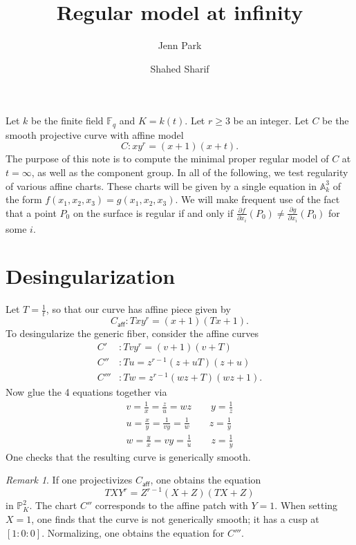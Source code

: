 \documentclass{article}
\newcommand{\caff}{C_{\textsf{aff}}}
\theoremstyle{plain}
\theoremstyle{definition}
\theoremstyle{remark}
\newtheorem{remark}[theorem]{Remark}
\newcommand{\F}{\ensuremath{\mathbb{F}}}
\newcommand{\Pro}{\ensuremath{\mathbb{P}}}
\begin{document}
\title{Regular model at infinity}
\author{Jenn Park \and Shahed Sharif}
\maketitle

Let $k$ be the finite field $\F_q$ and $K = k(t)$. Let $r \geq 3$ be an integer. Let $C$ be the smooth projective curve with affine model
\[
C: xy^r = (x+1)(x+t).
\]
The purpose of this note is to compute the minimal proper regular model of $C$ at $t = \infty$, as well as the component group. In all of the following, we test regularity of various affine charts. These charts will be given by a single equation in $\mathbb{A}^3_k$ of the form $f(x_1,x_2,x_3) = g(x_1,x_2,x_3)$. We will make frequent use of the fact that a point $P_0$ on the surface is regular if and only if $\frac{\partial f}{\partial x_i}(P_0) \neq \frac{\partial g}{\partial x_i}(P_0)$ for some $i$.

\section{Desingularization}
\label{sec:desingularization}

Let $T = \frac{1}{t}$, so that our curve has affine piece given by
\[
\caff:Txy^r = (x+1)(Tx+1).
\]
To desingularize the generic fiber, consider the affine curves
\begin{align*}
  C'&: Tvy^r = (v+1)(v+T) \\
  C''&: Tu = z^{r-1}(z+uT)(z+u) \\
  C'''&: Tw = z^{r-1}(wz+T)(wz+1).
\end{align*}
Now glue the 4 equations together via
\begin{gather*}
  v = \frac{1}{x} = \frac{z}{u} = wz \qquad y = \frac{1}{z} \\
  u = \frac{x}{y} = \frac{1}{vy} = \frac{1}{w} \qquad z = \frac{1}{y}\\
  w = \frac{y}{x} = vy = \frac{1}{u} \qquad z = \frac{1}{y}
\end{gather*}
One checks that the resulting curve is generically smooth.
\begin{remark}
  If one projectivizes $\caff$, one obtains the equation
  \[
  TXY^r = Z^{r-1}(X+Z)(TX+Z)
  \]
  in $\Pro^2_K$. The chart $C''$ corresponds to the affine patch with $Y = 1$. When setting $X = 1$, one finds that the curve is not generically smooth; it has a cusp at $[1:0:0]$. Normalizing, one obtains the equation for $C'''$. 
\end{remark}
\end{document}
